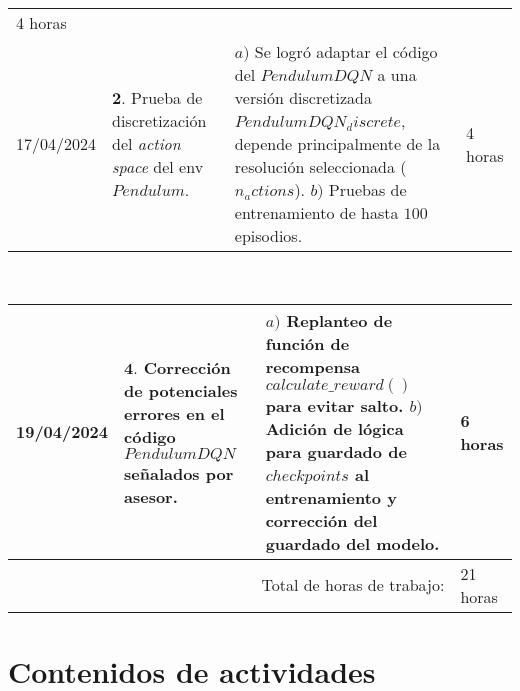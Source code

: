 \documentclass[12pt]{article}
\begin{document}
\begin{minipage}[h]{\textwidth}
\begin{tabularx}{\textwidth}{|p{2cm}|X|X|p{2cm}|}
	 	4 horas \\
		17/04/2024 & 
	 	$\mathbf{2}.$ Prueba de discretización del \textit{action space} del env $Pendulum$. &
	 	$a)$ Se logró adaptar el código del $PendulumDQN$ a una versión discretizada $PendulumDQN_discrete$, depende principalmente de la resolución seleccionada ($n_actions$). \newline
	 	$b)$ Pruebas de entrenamiento de hasta $100$ episodios. \newline & 
	 	4 horas \\
	 	\hline
	\end{tabularx}
\end{minipage}	 	
	 	
\hfill\\
\begin{minipage}[h]{\textwidth}
	\centering
	\begin{tabularx}{\textwidth}{|p{2cm}|X|X|p{2cm}|} 
		\hline		
		
	 	19/04/2024 & 
	 	$\mathbf{4}.$ Corrección de potenciales errores en el código $PendulumDQN$ señalados por asesor. &
	 	$a)$ Replanteo de función de recompensa $calculate\_ reward()$ para evitar salto. \newline
	 	$b)$ Adición de lógica para guardado de $checkpoints$ al entrenamiento y corrección del guardado del modelo. \newline & 
	 	6 horas \\
	 	
	 	\hline
		\multicolumn{3}{|r|}{Total de horas de trabajo:} & 21 horas \\ 
	 	\hline                 
	\end{tabularx}
\end{minipage}




\section*{Contenidos de actividades}
\end{document}
